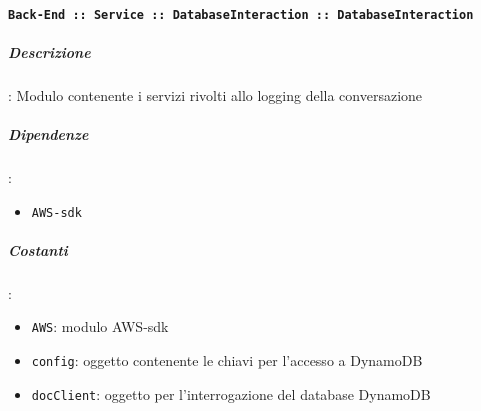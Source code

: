 \documentclass[../DefinizioneDiProdotto_v3.0.0.tex]{subfiles}
\begin{document}
\paragraph{\texttt{Back-End :: Service :: DatabaseInteraction :: DatabaseInteraction}}
\subparagraph{Descrizione}: Modulo contenente i servizi rivolti allo logging della conversazione
\subparagraph{Dipendenze}:
\begin{itemize}
	\item \texttt{AWS-sdk}
\end{itemize}
\subparagraph{Costanti}:
\begin{itemize}
	\item \texttt{AWS}: modulo AWS-sdk
	\item \texttt{config}: oggetto contenente le chiavi per l'accesso a DynamoDB
	\item \texttt{docClient}: oggetto per l'interrogazione del database DynamoDB
\end{itemize}
\end{document}
